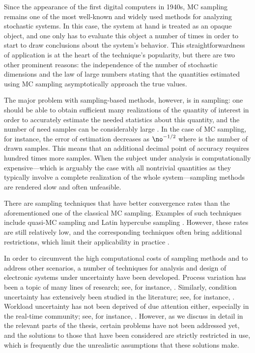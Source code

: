 Since the appearance of the first digital computers in 1940s, \ac{MC} sampling
remains one of the most well-known and widely used methods for analyzing
stochastic systems. In this case, the system at hand is treated as an opaque
object, and one only has to evaluate this object a number of times in order to
start to draw conclusions about the system's behavior. This straightforwardness
of application is at the heart of the technique's popularity, but there are two
other prominent reasons: the independence of the number of stochastic dimensions
and the law of large numbers \cite{durrett2010} stating that the quantities
estimated using \ac{MC} sampling asymptotically approach the true values.

The major problem with sampling-based methods, however, is in sampling: one
should be able to obtain sufficient many realizations of the quantity of
interest in order to accurately estimate the needed statistics about this
quantity, and the number of need samples can be considerably large
\cite{diaz-emparanza2002}. In the case of \ac{MC} sampling, for instance, the
error of estimation decreases as $\no^{-1/2}$ where \no is the number of drawn
samples. This means that an additional decimal point of accuracy requires
hundred times more samples. When the subject under analysis is computationally
expensive---which is arguably the case with all nontrivial quantities as they
typically involve a complete realization of the whole system---sampling methods
are rendered slow and often unfeasible.

There are sampling techniques that have better convergence rates than the
aforementioned one of the classical \ac{MC} sampling. Examples of such
techniques include quasi-\ac{MC} sampling and Latin hypercube sampling
\cite{asmussen2007}. However, these rates are still relatively low, and the
corresponding techniques often bring additional restrictions, which limit their
applicability in practice \cite{xiu2010}.

In order to circumvent the high computational costs of sampling methods and to
address other scenarios, a number of techniques for analysis and design of
electronic systems under uncertainty have been developed. Process variation has
been a topic of many lines of research; see, for instance, \cite{bhardwaj2006,
bhardwaj2008, chandra2010, juan2012, lee2013}. Similarly, condition uncertainty
has extensively been studied in the literature; see, for instance,
\cite{coskun2006, huang2009b, das2014c}. Workload uncertainty has not been
deprived of due attention either, especially in the real-time community; see,
for instance, \cite{diaz2002, santinelli2011, quinton2012, tanasa2015}. However,
as we discuss in detail in the relevant parts of the thesis, certain problems
have not been addressed yet, and the solutions to those that have been
considered are strictly restricted in use, which is frequently due the
unrealistic assumptions that these solutions make.

